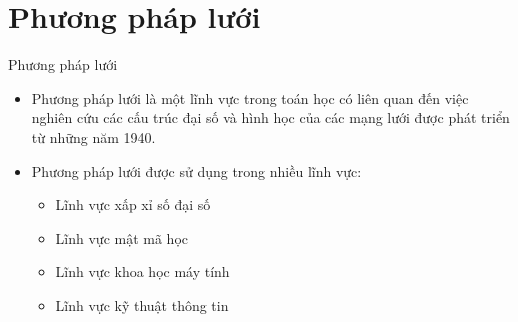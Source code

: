 \documentclass{beamer}
\numberwithin{equation}{section}
\begin{document}
\section{Phương pháp lưới}
\begin{frame}{Phương pháp lưới}
\begin{itemize}
\item Phương pháp lưới là một lĩnh vực trong toán học có liên quan đến việc nghiên cứu các cấu trúc đại số và hình học của các mạng lưới được phát triển từ những năm 1940.
\item Phương pháp lưới được sử dụng trong nhiều lĩnh vực:
\begin{itemize}
\item Lĩnh vực xấp xỉ số đại số
\item Lĩnh vực mật mã học
\item Lĩnh vực khoa học máy tính
\item Lĩnh vực kỹ thuật thông tin
\end{itemize}
\end{itemize}
\end{frame}
\end{document}

